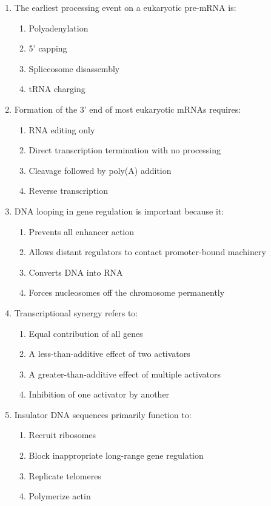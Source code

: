 \documentclass[12pt,fontset=none]{ctexart}
\begin{document}
\begin{enumerate}
\item The earliest processing event on a eukaryotic pre-mRNA is:
\begin{enumerate}[label=\alph*.]
\item Polyadenylation
\item 5' capping
\item Spliceosome disassembly
\item tRNA charging
\end{enumerate}

\item Formation of the 3' end of most eukaryotic mRNAs requires:
\begin{enumerate}[label=\alph*.]
\item RNA editing only
\item Direct transcription termination with no processing
\item Cleavage followed by poly(A) addition
\item Reverse transcription
\end{enumerate}

\item DNA looping in gene regulation is important because it:
\begin{enumerate}[label=\alph*.]
\item Prevents all enhancer action
\item Allows distant regulators to contact promoter-bound machinery
\item Converts DNA into RNA
\item Forces nucleosomes off the chromosome permanently
\end{enumerate}

\item Transcriptional synergy refers to:
\begin{enumerate}[label=\alph*.]
\item Equal contribution of all genes
\item A less-than-additive effect of two activators
\item A greater-than-additive effect of multiple activators
\item Inhibition of one activator by another
\end{enumerate}

\item Insulator DNA sequences primarily function to:
\begin{enumerate}[label=\alph*.]
\item Recruit ribosomes
\item Block inappropriate long-range gene regulation
\item Replicate telomeres
\item Polymerize actin
\end{enumerate}


\end{enumerate}
\end{document}
